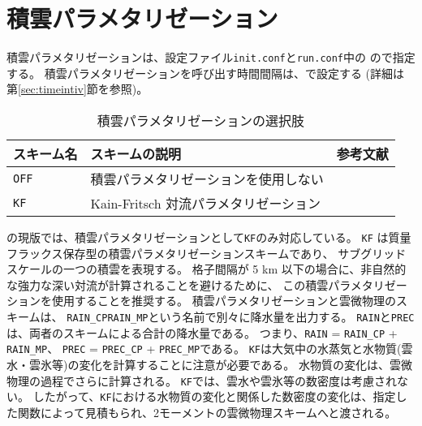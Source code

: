 \section{積雲パラメタリゼーション} \label{sec:basic_usel_cumulus}

積雲パラメタリゼーションは、設定ファイル\verb|init.conf|と\verb|run.conf|中の
ので指定する。
積雲パラメタリゼーションを呼び出す時間間隔は、で設定する
(詳細は第\ref{sec:timeintiv}節を参照)。

\begin{table}[h]
\begin{center}
  \caption{積雲パラメタリゼーションの選択肢}
  \label{tab:nml_atm_cp}
  \begin{tabularx}{150mm}{lXX} \hline
    \rowcolor[gray]{0.9}  スキーム名 & スキームの説明 & 参考文献 \\ \hline
      \verb|OFF|  & 積雲パラメタリゼーションを使用しない &  \\
      \verb|KF|   & Kain-Fritsch 対流パラメタリゼーション & \citet{kain_1990,kain_2004} \\
    \hline
  \end{tabularx}
\end{center}
\end{table}

\scalerm の現版では、積雲パラメタリゼーションとして\verb|KF|のみ対応している。
\verb|KF| は質量フラックス保存型の積雲パラメタリゼーションスキームであり、
サブグリッドスケールの一つの積雲を表現する。
格子間隔が 5 km 以下の場合に、非自然的な強力な深い対流が計算されることを避けるために、
この積雲パラメタリゼーションを使用することを推奨する。
積雲パラメタリゼーションと雲微物理のスキームは、
\verb|RAIN_CP|\verb|RAIN_MP|という名前で別々に降水量を出力する。
\verb|RAIN|と\verb|PREC|は、両者のスキームによる合計の降水量である。
つまり、\verb|RAIN| = \verb|RAIN_CP| + \verb|RAIN_MP|、
\verb|PREC| = \verb|PREC_CP| + \verb|PREC_MP|である。
\verb|KF|は大気中の水蒸気と水物質(雲水・雲氷等)の変化を計算することに注意が必要である。
水物質の変化は、雲微物理の過程でさらに計算される。
\verb|KF|では、雲水や雲氷等の数密度は考慮されない。
したがって、\verb|KF|における水物質の変化と関係した数密度の変化は、指定した関数によって見積もられ、2モーメントの雲微物理スキームへと渡される。


